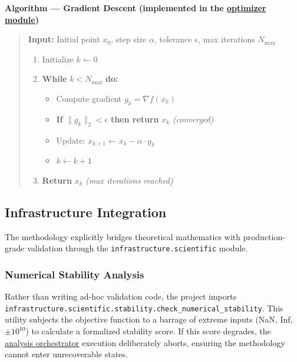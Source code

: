 \documentclass[
]{article}
\providecommand{\tightlist}{%
  \setlength{\itemsep}{0pt}\setlength{\parskip}{0pt}}
\begin{document}
\textbf{Algorithm --- Gradient Descent (implemented in the
\href{https://github.com/docxology/template/blob/main/projects/template_code_project/src/optimizer.py\#L87-L173}{optimizer
module})}

\begin{quote}
\textbf{Input:} Initial point \(x_0\), step size \(\alpha\), tolerance
\(\epsilon\), max iterations \(N_{\max}\)

\begin{enumerate}
\def\labelenumi{\arabic{enumi}.}
\tightlist
\item
  Initialize \(k \leftarrow 0\)
\item
  \textbf{While} \(k < N_{\max}\) \textbf{do:}

  \begin{itemize}
  \tightlist
  \item
    Compute gradient \(g_k = \nabla f(x_k)\)
  \item
    \textbf{If} \(\|g_k\|_2 < \epsilon\) \textbf{then return} \(x_k\)
    \emph{(converged)}
  \item
    Update: \(x_{k+1} \leftarrow x_k - \alpha \cdot g_k\)
  \item
    \(k \leftarrow k + 1\)
  \end{itemize}
\item
  \textbf{Return} \(x_k\) \emph{(max iterations reached)}
\end{enumerate}
\end{quote}

\subsection{Infrastructure
Integration}\label{infrastructure-integration-1}

The methodology explicitly bridges theoretical mathematics with
production-grade validation through the
\texttt{infrastructure.scientific} module.

\subsubsection{Numerical Stability
Analysis}\label{numerical-stability-analysis}

Rather than writing ad-hoc validation code, the project imports
\texttt{infrastructure.scientific.stability.check\_numerical\_stability}.
This utility subjects the objective function to a barrage of extreme
inputs (NaN, Inf, \(\pm 10^{10}\)) to calculate a formalized stability
score. If this score degrades, the
\href{https://github.com/docxology/template/blob/main/scripts/02_run_analysis.py}{analysis
orchestrator} execution deliberately aborts, ensuring the methodology
cannot enter unrecoverable states.
\end{document}
